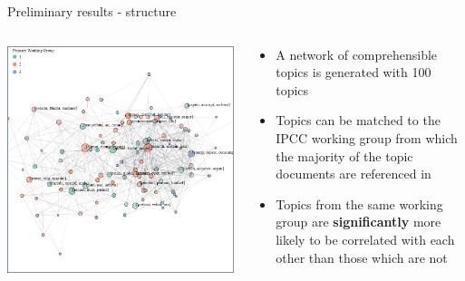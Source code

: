 \documentclass[9pt]{beamer}
\begin{document}
\begin{frame}{Preliminary results - structure}

\begin{columns}
	\begin{column}{0.5\linewidth}
		\begin{center}
			\includegraphics[width=0.85\linewidth]{../plots/network_wg_65.png}
		\end{center}
	\end{column}
	\begin{column}{0.5\linewidth}
		\begin{center}
			\begin{itemize}
				\item A network of comprehensible topics is generated with 100 topics
				\item Topics can be matched to the IPCC working group from which the majority of the topic documents are referenced in
				\item Topics from the same working group are \textbf{significantly} more likely to be correlated with each other than those which are not
			\end{itemize}
		\end{center}
	\end{column}
\end{columns}

\end{frame}
\end{document}
